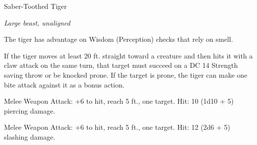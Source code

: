 \begin{monsterbox}{Saber-Toothed Tiger}
\begin{hangingpar}
\textit{Large beast, unaligned}
\end{hangingpar}
\dndline%
\basics[%
armorclass = 12,
hitpoints = 7d10 + 14,
speed = {40 ft.}
]
\dndline%
\stats[%
STR = \stat{18},
DEX = \stat{14},
CON = \stat{15},
INT = \stat{3},
WIS = \stat{12},
CHA = \stat{8}
]
\dndline%
\details[%
skills={Stealth +6, Perception +3, },
damageimmunities={},
savingthrows={},
conditionimmunities={},
damageresistances={},
damagevulnerabilities={},
senses={passive Perception 13},
challenge=2
]
\dndline%
\begin{monsteraction}
The tiger has advantage on Wisdom (Perception) checks that rely on smell.
\end{monsteraction}
\begin{monsteraction}[Pounce]
If the tiger moves at least 20 ft. straight toward a creature and then hits it with a claw attack on the same turn, that target must succeed on a DC 14 Strength saving throw or be knocked prone. If the target is prone, the tiger can make one bite attack against it as a bonus action.
\end{monsteraction}
\begin{monsteraction}[Bite]
Melee Weapon Attack: +6 to hit, reach 5 ft., one target. Hit: 10 (1d10 + 5) piercing damage.
\end{monsteraction}
\begin{monsteraction}[Claw]
Melee Weapon Attack: +6 to hit, reach 5 ft., one target. Hit: 12 (2d6 + 5) slashing damage.
\end{monsteraction}
\end{monsterbox}